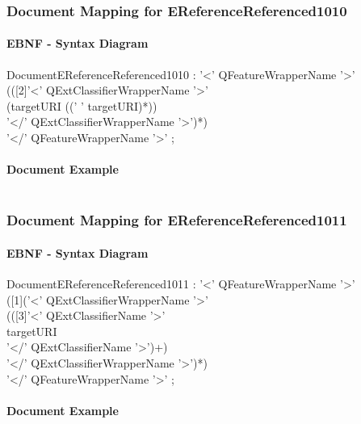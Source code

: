 \documentclass[11pt,a4paper]{article}
\begin{document}
\subsubsection{Document Mapping for EReferenceReferenced1010}
\paragraph{EBNF - Syntax Diagram}
\begin{rail}
DocumentEReferenceReferenced1010 : '<' QFeatureWrapperName '>' \\
(([2]'<' QExtClassifierWrapperName '>'\\
(targetURI ((' ' targetURI)*)) \\
'</' QExtClassifierWrapperName '>')*) \\
'</' QFeatureWrapperName '>' ;
\end{rail}

\paragraph{Document Example}
\inputminted[fontsize=\footnotesize]{xml}{examples/EReferenceReferenced1010.xml}


\subsubsection{Document Mapping for EReferenceReferenced1011}
\paragraph{EBNF - Syntax Diagram}
\begin{rail}
DocumentEReferenceReferenced1011 : '<' QFeatureWrapperName '>' \\
([1]('<' QExtClassifierWrapperName '>'\\
(([3]'<' QExtClassifierName  '>' \\ 
targetURI \\ 
'</' QExtClassifierName  '>')+) \\
'</' QExtClassifierWrapperName '>')*) \\
'</' QFeatureWrapperName '>' ;
\end{rail}

\paragraph{Document Example}
\inputminted[fontsize=\footnotesize]{xml}{examples/EReferenceReferenced1011.xml}
\end{document}
